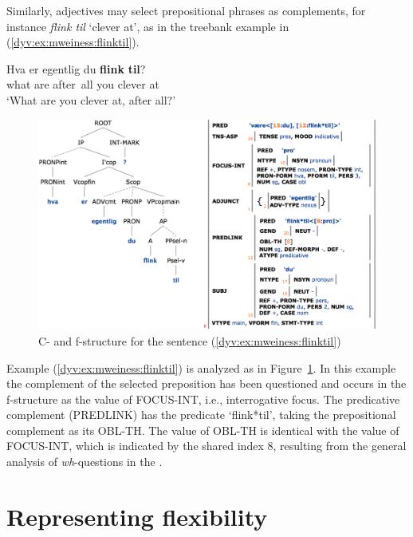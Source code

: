 \documentclass[output=paper]{langsci/langscibook}
\begin{document}
Similarly, adjectives may select prepositional phrases as complements, for instance \textit{flink til} `clever at', as in the treebank example in (\ref{dyv:ex:mweiness:flinktil}).

\ea\label{dyv:ex:mweiness:flinktil}
\gll Hva er egentlig du \textbf{flink} \textbf{til}? \\
     what are after all you clever at\\
\glt `What are you clever at, after all?'
\z

\begin{figure}
  \includegraphics[width=\textwidth]{figures/flinktil-c-f.png}
  \caption{C- and f-structure for the sentence  (\ref{dyv:ex:mweiness:flinktil}) }
  \label{dyv:fig:mweiness:flinktil-c-f}
\end{figure}

Example  (\ref{dyv:ex:mweiness:flinktil}) is analyzed as in Figure~\ref{dyv:fig:mweiness:flinktil-c-f}.
In this example the complement of the selected preposition has been questioned and occurs in the f-structure as the value of FOCUS-INT, i.e., interrogative focus.
The predicative complement (PREDLINK) has the predicate `flink*til', taking the prepositional complement as its OBL-TH.
The value of OBL-TH is identical with the value of  FOCUS-INT, which is indicated by the shared index 8, resulting from the general analysis of \textit{wh}-questions in the .

\section{Representing flexibility}\label{dyv:sec:mweiness:variation}
\end{document}
